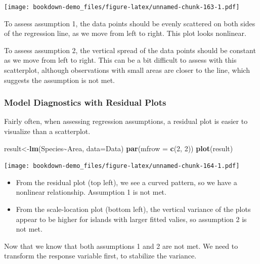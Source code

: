 \documentclass[
]{book}
\newenvironment{Shaded}{\begin{snugshade}}{\end{snugshade}}
\newcommand{\AttributeTok}[1]{\textcolor[rgb]{0.13,0.29,0.53}{#1}}
\newcommand{\DecValTok}[1]{\textcolor[rgb]{0.00,0.00,0.81}{#1}}
\newcommand{\FunctionTok}[1]{\textcolor[rgb]{0.13,0.29,0.53}{\textbf{#1}}}
\newcommand{\NormalTok}[1]{#1}
\newcommand{\OtherTok}[1]{\textcolor[rgb]{0.56,0.35,0.01}{#1}}
\newcommand{\SpecialCharTok}[1]{\textcolor[rgb]{0.81,0.36,0.00}{\textbf{#1}}}
\begin{document}
\texttt{[image: bookdown-demo\_files/figure-latex/unnamed-chunk-163-1.pdf]}

To assess assumption 1, the data points should be evenly scattered on both sides of the regression line, as we move from left to right. This plot looks nonlinear.

To assess assumption 2, the vertical spread of the data points should be constant as we move from left to right. This can be a bit difficult to assess with this scatterplot, although observations with small areas are closer to the line, which suggests the assumption is not met.

\hypertarget{model-diagnostics-with-residual-plots-1}{%
\subsubsection*{Model Diagnostics with Residual Plots}\label{model-diagnostics-with-residual-plots-1}}

Fairly often, when assessing regression assumptions, a residual plot is easier to visualize than a scatterplot.

\begin{Shaded}
\begin{Highlighting}[]
\NormalTok{result}\OtherTok{\textless{}{-}}\FunctionTok{lm}\NormalTok{(Species}\SpecialCharTok{\textasciitilde{}}\NormalTok{Area, }\AttributeTok{data=}\NormalTok{Data)}
\FunctionTok{par}\NormalTok{(}\AttributeTok{mfrow =} \FunctionTok{c}\NormalTok{(}\DecValTok{2}\NormalTok{, }\DecValTok{2}\NormalTok{))}
\FunctionTok{plot}\NormalTok{(result)}
\end{Highlighting}
\end{Shaded}

\texttt{[image: bookdown-demo\_files/figure-latex/unnamed-chunk-164-1.pdf]}

\begin{itemize}
\item
  From the residual plot (top left), we see a curved pattern, so we have a nonlinear relationship. Assumption 1 is not met.
\item
  From the scale-location plot (bottom left), the vertical variance of the plots appear to be higher for islands with larger fitted valies, so assumption 2 is not met.
\end{itemize}

Now that we know that both assumptions 1 and 2 are not met. We need to transform the response variable first, to stabilize the variance.
\end{document}
